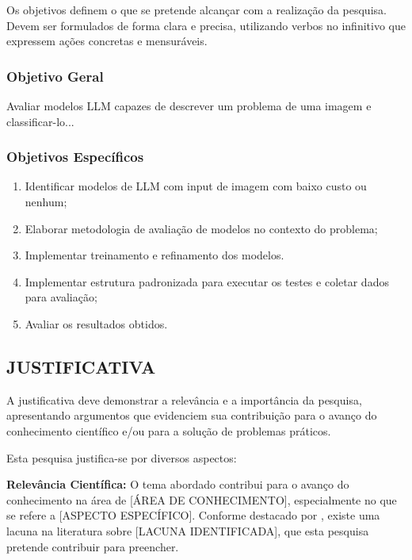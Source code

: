\documentclass[
    12pt,        %
    openany,     %
    oneside,     %
    a4paper,     %
    english,     %
    brazil,      %
    article      %
]{abntex2}
\begin{document}
Os objetivos definem o que se pretende alcançar com a realização da pesquisa. Devem ser formulados de forma clara e precisa, utilizando verbos no infinitivo que expressem ações concretas e mensuráveis.

\subsubsection{Objetivo Geral}
\label{subsubsec:objetivo-geral}

Avaliar modelos LLM capazes de descrever um problema de uma imagem e classificar-lo...  

\subsubsection{Objetivos Específicos}
\label{subsubsec:objetivos-especificos}

\begin{enumerate}
    \item Identificar modelos de LLM com input de imagem com baixo custo ou nenhum;
    \item Elaborar metodologia de avaliação de modelos no contexto do problema;
    \item Implementar treinamento e refinamento dos modelos.
    \item Implementar estrutura padronizada para executar os testes e coletar dados para avaliação;
    \item Avaliar os resultados obtidos.
\end{enumerate}


\subsection{JUSTIFICATIVA}
\label{subsec:justificativa}

A justificativa deve demonstrar a relevância e a importância da pesquisa, apresentando argumentos que evidenciem sua contribuição para o avanço do conhecimento científico e/ou para a solução de problemas práticos.

Esta pesquisa justifica-se por diversos aspectos:

\textbf{Relevância Científica:} O tema abordado contribui para o avanço do conhecimento na área de [ÁREA DE CONHECIMENTO], especialmente no que se refere a [ASPECTO ESPECÍFICO]. Conforme destacado por , existe uma lacuna na literatura sobre [LACUNA IDENTIFICADA], que esta pesquisa pretende contribuir para preencher.
\end{document}
